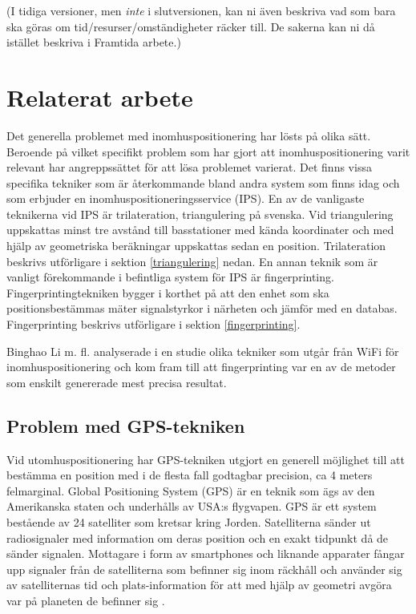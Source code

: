 \documentclass[swedish, a4paper,12pt]{article}
\begin{document}
(I tidiga versioner, men \emph{inte} i slutversionen, kan ni även beskriva vad som bara ska göras om tid/resurser/omständigheter räcker till. De sakerna kan ni då istället beskriva i Framtida arbete.)
\fi

\section{Relaterat arbete}
Det generella problemet med inomhuspositionering har lösts på olika sätt.
Beroende på vilket specifikt problem som har gjort att inomhuspositionering varit relevant har angreppssättet för att lösa problemet varierat. Det finns vissa specifika tekniker som är återkommande bland andra system som finns idag och som erbjuder en inomhuspositioneringsservice (IPS)\cite{IP1}.
En av de vanligaste teknikerna vid IPS är trilateration\cite{cook2005indoor}, triangulering på svenska. Vid triangulering uppskattas minst tre avstånd till basstationer med kända koordinater och med hjälp av geometriska beräkningar uppskattas sedan en position. Trilateration beskrivs utförligare i sektion \ref{triangulering}
 nedan. En annan teknik som är vanligt förekommande i befintliga system för IPS är fingerprinting\cite{IP1}\cite{jun2018low}. Fingerprintingtekniken bygger i korthet på att den enhet som ska positionsbestämmas mäter signalstyrkor i närheten och jämför med en databas. Fingerprinting beskrivs utförligare i sektion \ref{fingerprinting}.

Binghao Li m. fl. analyserade i en studie \cite{IP1} olika tekniker som utgår från WiFi för inomhuspositionering och kom fram till att fingerprinting var en av de metoder som enskilt genererade mest precisa resultat.


\subsection{Problem med GPS-tekniken}
Vid utomhuspositionering har GPS-tekniken utgjort en generell möjlighet till att bestämma en position med i de flesta fall godtagbar precision, ca 4 meters felmarginal\cite{GPS_US_ACCURACY}.
Global Positioning System (GPS) är en teknik som ägs av den Amerikanska staten och underhålls av USA:s flygvapen. GPS är ett system bestående av 24 satelliter som kretsar kring Jorden. Satelliterna sänder ut radiosignaler med information
om deras position och en exakt tidpunkt då de sänder signalen. Mottagare i form av smartphones och liknande apparater fångar upp signaler från de satelliterna som befinner sig inom räckhåll och använder sig av satelliternas tid och plats-information för att med hjälp av geometri avgöra var på planeten de befinner sig \cite{GPS_US_HOW}.
\end{document}
